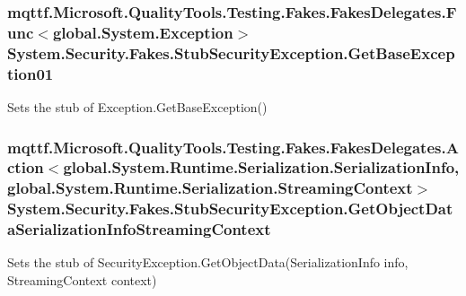 \hypertarget{class_system_1_1_security_1_1_fakes_1_1_stub_security_exception_ab09a5187af01f82c2be7a48e876861c3}{
\subsubsection[{Get\-Base\-Exception01}]{\setlength{\rightskip}{0pt plus 5cm}mqttf.\-Microsoft.\-Quality\-Tools.\-Testing.\-Fakes.\-Fakes\-Delegates.\-Func$<$global.\-System.\-Exception$>$ System.\-Security.\-Fakes.\-Stub\-Security\-Exception.\-Get\-Base\-Exception01}}\label{class_system_1_1_security_1_1_fakes_1_1_stub_security_exception_ab09a5187af01f82c2be7a48e876861c3}


Sets the stub of Exception.\-Get\-Base\-Exception()

\hypertarget{class_system_1_1_security_1_1_fakes_1_1_stub_security_exception_a002712d5c9aa088e7d3d9892d3386821}{
\subsubsection[{Get\-Object\-Data\-Serialization\-Info\-Streaming\-Context}]{\setlength{\rightskip}{0pt plus 5cm}mqttf.\-Microsoft.\-Quality\-Tools.\-Testing.\-Fakes.\-Fakes\-Delegates.\-Action$<$global.\-System.\-Runtime.\-Serialization.\-Serialization\-Info, global.\-System.\-Runtime.\-Serialization.\-Streaming\-Context$>$ System.\-Security.\-Fakes.\-Stub\-Security\-Exception.\-Get\-Object\-Data\-Serialization\-Info\-Streaming\-Context}}\label{class_system_1_1_security_1_1_fakes_1_1_stub_security_exception_a002712d5c9aa088e7d3d9892d3386821}


Sets the stub of Security\-Exception.\-Get\-Object\-Data(\-Serialization\-Info info, Streaming\-Context context)

